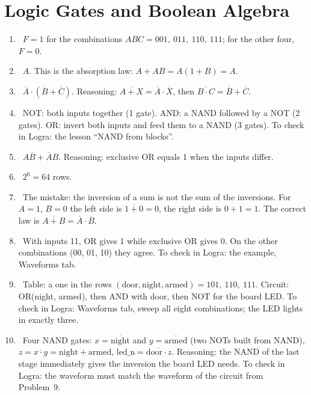 \section*{Logic Gates and Boolean Algebra}
\begin{enumerate}
  \item {}~$F=1$ for the combinations $ABC = 001,\ 011,\ 110,\ 111$; for the other four, $F=0$.
  \item {}~$A$. This is the absorption law: $A + AB = A(1+B) = A$.
  \item {}~$\overline{A}\cdot(\overline{B}+\overline{C})$. Reasoning: $\overline{A+X}=\overline{A}\cdot\overline{X}$, then $\overline{B\cdot C}=\overline{B}+\overline{C}$.
  \item {}~NOT: both inputs together (1 gate). AND: a NAND followed by a NOT (2 gates). OR: invert both inputs and feed them to a NAND (3 gates). To check in Logra: the lesson ``NAND from blocks''.
  \item {}~$A\overline{B}+\overline{A}B$. Reasoning: exclusive OR equals 1 when the inputs differ.
  \item {}~$2^6=64$ rows.
  \item {}~The mistake: the inversion of a sum is not the sum of the inversions. For $A=1$, $B=0$ the left side is $\overline{1+0}=0$, the right side is $0+1=1$. The correct law is $\overline{A+B}=\overline{A}\cdot\overline{B}$.
  \item {}~With inputs 11, OR gives 1 while exclusive OR gives 0. On the other combinations (00, 01, 10) they agree. To check in Logra: the  example, Waveforms tab.
  \item {}~Table: a one in the rows $(\text{door},\text{night},\text{armed})=101,\ 110,\ 111$. Circuit: OR(night, armed), then AND with door, then NOT for the board LED. To check in Logra: Waveforms tab, sweep all eight combinations; the LED lights in exactly three.
  \item {}~Four NAND gates: $x=\overline{\text{night}}$ and $y=\overline{\text{armed}}$ (two NOTs built from NAND), $z=\overline{x\cdot y}=\text{night}+\text{armed}$, $\text{led\_n}=\overline{\text{door}\cdot z}$. Reasoning: the NAND of the last stage immediately gives the inversion the board LED needs. To check in Logra: the waveform must match the waveform of the circuit from Problem~9.
\end{enumerate}

